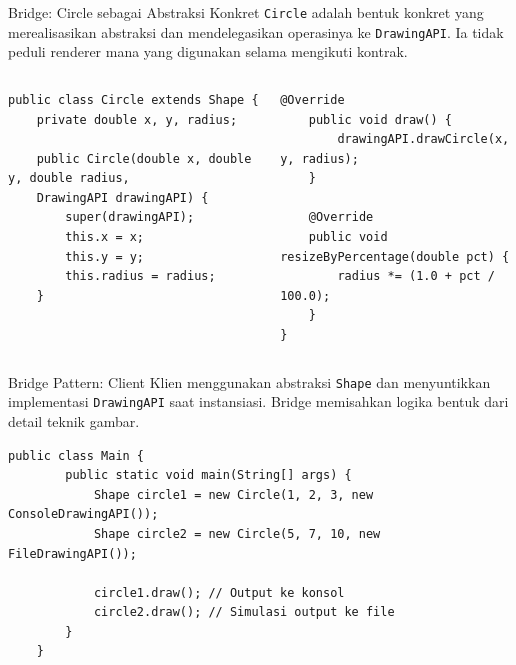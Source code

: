 \documentclass[aspectratio=169, table]{beamer}
\begin{document}
\begin{frame}[fragile]{Bridge: Circle sebagai Abstraksi Konkret}
\vspace{20pt}
\texttt{Circle} adalah bentuk konkret yang merealisasikan abstraksi dan mendelegasikan operasinya ke \texttt{DrawingAPI}. Ia tidak peduli renderer mana yang digunakan selama mengikuti kontrak.

\begin{columns}[T]
\begin{lstlisting}[style=JavaStyle, basicstyle=\ttfamily\scriptsize]
public class Circle extends Shape {
	private double x, y, radius;
	
	public Circle(double x, double y, double radius,
	DrawingAPI drawingAPI) {
		super(drawingAPI);
		this.x = x;
		this.y = y;
		this.radius = radius;
	}
\end{lstlisting}

\begin{lstlisting}[style=JavaStyle, basicstyle=\ttfamily\scriptsize]
	@Override
	public void draw() {
		drawingAPI.drawCircle(x, y, radius);
	}
	
	@Override
	public void resizeByPercentage(double pct) {
		radius *= (1.0 + pct / 100.0);
	}
}
\end{lstlisting}
\end{columns}
\end{frame}


\begin{frame}[fragile]{Bridge Pattern: Client}
	\vspace{20pt}
	Klien menggunakan abstraksi \texttt{Shape} dan menyuntikkan implementasi \texttt{DrawingAPI} saat instansiasi. 
	Bridge memisahkan logika bentuk dari detail teknik gambar.
	
\begin{lstlisting}[style=JavaStyle]
	public class Main {
		public static void main(String[] args) {
			Shape circle1 = new Circle(1, 2, 3, new ConsoleDrawingAPI());
			Shape circle2 = new Circle(5, 7, 10, new FileDrawingAPI());
			
			circle1.draw(); // Output ke konsol
			circle2.draw(); // Simulasi output ke file
		}
	}
\end{lstlisting}
\end{frame}
\end{document}
